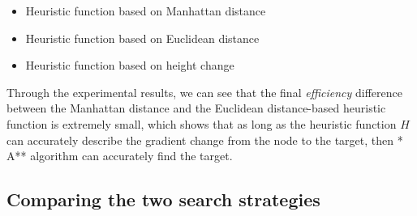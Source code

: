 \documentclass[
]{article}
\begin{document}
\begin{itemize}
\item
  Heuristic function based on Manhattan distance
\item
  Heuristic function based on Euclidean distance
\item
  Heuristic function based on height change
\end{itemize}

Through the experimental results, we can see that the final
\emph{efficiency} difference between the Manhattan distance and the
Euclidean distance-based heuristic function is extremely small, which
shows that as long as the heuristic function \(H\) can accurately
describe the gradient change from the node to the target, then * A**
algorithm can accurately find the target.

\subsection{Comparing the two search strategies}
\end{document}
